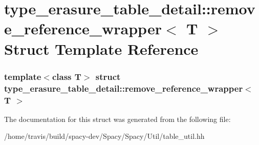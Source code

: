 \hypertarget{structtype__erasure__table__detail_1_1remove__reference__wrapper}{\section{type\-\_\-erasure\-\_\-table\-\_\-detail\-:\-:remove\-\_\-reference\-\_\-wrapper$<$ \-T $>$ \-Struct \-Template \-Reference}
\label{structtype__erasure__table__detail_1_1remove__reference__wrapper}
}
\subsubsection*{template$<$class T$>$ struct type\-\_\-erasure\-\_\-table\-\_\-detail\-::remove\-\_\-reference\-\_\-wrapper$<$ T $>$}



\-The documentation for this struct was generated from the following file\-:\begin{DoxyCompactItemize}
\item 
/home/travis/build/spacy-\/dev/\-Spacy/\-Spacy/\-Util/table\-\_\-util.\-hh\end{DoxyCompactItemize}
